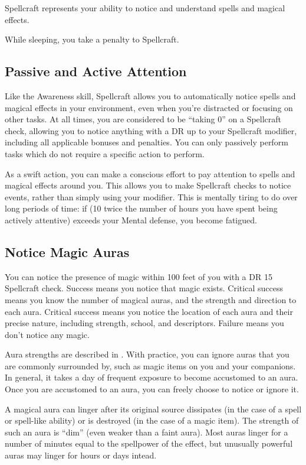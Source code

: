         Spellcraft represents your ability to notice and understand spells and magical effects.

        While sleeping, you take a  penalty to Spellcraft.

    \subsection{Passive and Active Attention}\label{Spellcraft-Passive and Active Attention}
        Like the Awareness skill, Spellcraft allows you to automatically notice spells and magical effects in your environment, even when you're distracted or focusing on other tasks. At all times, you are considered to be ``taking 0'' on a Spellcraft check, allowing you to notice anything with a DR up to your Spellcraft modifier, including all applicable bonuses and penalties. You can only passively perform tasks which do not require a specific action to perform.

        As a swift action, you can make a conscious effort to pay attention to spells and magical effects around you. This allows you to make Spellcraft checks to notice events, rather than simply using your modifier. This is mentally tiring to do over long periods of time: if (10 \add twice the number of hours you have spent being actively attentive) exceeds your Mental defense, you become fatigued.

    \subsection{Notice Magic Auras}
        You can notice the presence of magic within 100 feet of you with a DR 15 Spellcraft check. Success means you notice that magic exists. Critical success means you know the number of magical auras, and the strength and direction to each aura. Critical success means you notice the location of each aura and their precise nature, including strength, school, and descriptors. Failure means you don't notice any magic.

        Aura strengths are described in . With practice, you can ignore auras that you are commonly surrounded by, such as magic items on you and your companions. In general, it takes a day of frequent exposure to become accustomed to an aura. Once you are accustomed to an aura, you can freely choose to notice or ignore it.

        A magical aura can linger after its original source dissipates (in the case of a spell or spell-like ability) or is destroyed (in the case of a magic item). The strength of such an aura is ``dim'' (even weaker than a faint aura). Most auras linger for a number of minutes equal to the spellpower of the effect, but unusually powerful auras may linger for hours or days intead.

